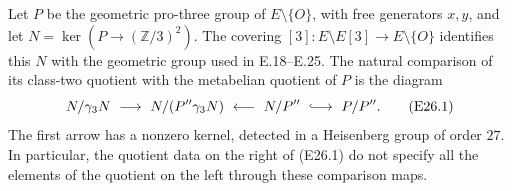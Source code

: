 \begin{proposition}
\label{E-elliptic-cover-comparison}
Let $P$ be the geometric pro-three group of $E\setminus\{O\}$,
with free generators $x,y$, and let
$N=\ker(P\to(\mathbb Z/3)^2)$. The covering
$[3]:E\setminus E[3]\to E\setminus\{O\}$ identifies
this $N$ with the geometric group used in E.18--E.25.
The natural comparison of its class-two quotient with
the metabelian quotient of $P$ is the diagram
\[
 N/\gamma_3N\ \longrightarrow\
 N/(P''\gamma_3N)\ \longleftarrow\ N/P''
 \ \lhook\joinrel\longrightarrow\ P/P'' .
 \tag{E26.1}
\]
The first arrow has a nonzero kernel, detected in a
Heisenberg group of order $27$. In particular, the
quotient data on the right of (E26.1) do not specify
all the elements of the quotient on the left through
these comparison maps.
\end{proposition}
